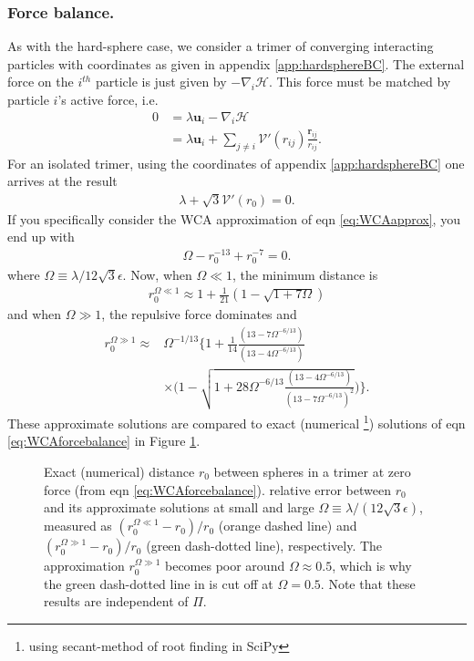 \documentclass[twocolumn,amsmath,amssymb,aps]{revtex4-1}%
\begin{document}
\subsubsection{Force balance.}
As with the hard-sphere case, we consider a trimer of converging interacting
particles with coordinates as given in appendix \ref{app:hardsphereBC}. The
external force on the $i^{th}$ particle is just given by
$-\nabla_i\mathcal{H}$. This force must be matched by particle $i$'s active
force, i.e.
\begin{align}
  0
  &= \lambda\bm{u}_i-\nabla_i\mathcal{H}\nonumber\\
  &= \lambda\bm{u}_i+\sum_{j\neq i}\mathcal{V}'(r_{ij})
    \frac{\bm{r}_{ij}}{r_{ij}}.
\end{align}
For an isolated trimer, using the coordinates of appendix
\ref{app:hardsphereBC} one arrives at the result
\begin{align}\label{eq:genericsoftsphereforcebalance}
  \lambda+\sqrt{3}\mathcal{V}'(r_0)=0.
\end{align}
If you specifically consider the WCA approximation of eqn \ref{eq:WCAapprox},
you end up with
\begin{align}\label{eq:WCAforcebalance}
  \Omega-r_0^{-13}+r_0^{-7}=0.
\end{align}
where $\Omega\equiv{\lambda}/{12\sqrt{3}\epsilon}$.
Now, when $\Omega\ll 1$, the minimum distance is
\begin{align}\label{eq:softsphereforcebalancesmalllambda}
  r_0^{\Omega\ll 1} \approx1+\frac{1}{21}(1-\sqrt{1+7\Omega})
\end{align}
and when $\Omega\gg 1$, the repulsive force dominates and
\begin{align}\label{eq:softsphereforcebalancelargelambda}
  r_0^{\Omega\gg 1}\approx
  &\Omega^{-1/13}\bigg\{1
    +\frac{1}{14}\frac{(13-7\Omega^{-6/13})}{(13-4\Omega^{-6/13})}\nonumber\\
  &\times\bigg(1-\sqrt{1+28\Omega^{-6/13}\frac{(13-4\Omega^{-6/13})}
    {(13-7\Omega^{-6/13})^2}}\bigg)\bigg\}.
\end{align}
These approximate solutions are compared to exact (numerical
\footnote{using secant-method of root finding in SciPy})
solutions of eqn \ref{eq:WCAforcebalance} in Figure \ref{fig:2}.

\begin{figure}[!t]
  \subfloat{\label{fig:2b}}
  \caption{\protect{} Exact (numerical) distance $r_0$ between
    spheres in a trimer at zero force (from eqn \ref{eq:WCAforcebalance}).
    \protect{} relative error between $r_0$ and its approximate
    solutions at small and large $\Omega\equiv\lambda/(12\sqrt{3}\epsilon)$,
    measured as $(r_0^{\Omega\ll1}-r_0)/r_0$ (orange dashed line) and
    $(r_0^{\Omega\gg1}-r_0)/r_0$ (green dash-dotted line), respectively.
    The approximation $r_0^{\Omega\gg1}$ becomes poor around
    $\Omega\approx0.5$, which is why the green dash-dotted line in
    \protect{} is cut off at $\Omega = 0.5$. Note that these
    results are independent of $\Pi$.}\label{fig:2}
\end{figure}
  
\end{document}
